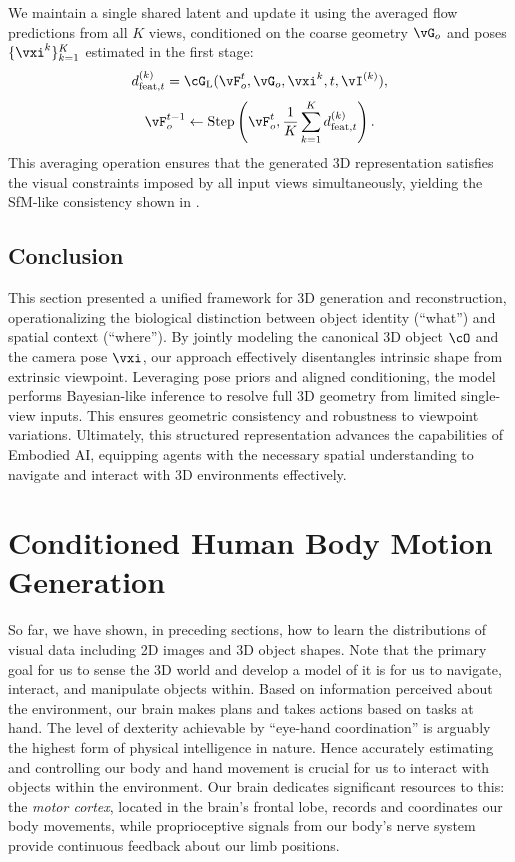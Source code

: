 \documentclass[../../book-main.tex]{subfiles}
\begin{document}
We maintain a single shared latent and update it using the averaged flow predictions from all \(K\) views, conditioned on the coarse geometry \(\vG_{o}\) and poses \(\{\pose^{k}\}_{k=1}^{K}\) estimated in the first stage:
\begin{equation}
    d_{\text{feat}, t}^{(k)} = \lflow(\vF_{o}^{t}, \vG_{o}, \pose^{k}, t, \image^{(k)}) ,
\end{equation}
\begin{equation}
    \vF_{o}^{t-1} \leftarrow \text{Step}\left(\vF_{o}^{t}, \frac{1}{K} \sum_{k=1}^{K} d_{\text{feat}, t}^{(k)}\right) .
\end{equation}
This averaging operation ensures that the generated 3D representation satisfies the visual constraints imposed by all input views simultaneously, yielding the SfM-like consistency shown in .

\subsection{Conclusion}
This section presented a unified framework for 3D generation and reconstruction, operationalizing the biological distinction between object identity (``what'') and spatial context (``where'').
By jointly modeling the canonical 3D object \(\object\) and the camera pose \(\pose\), our approach effectively disentangles intrinsic shape from extrinsic viewpoint.
Leveraging pose priors and aligned conditioning, the model performs Bayesian-like inference to resolve full 3D geometry from limited single-view inputs.
This ensures geometric consistency and robustness to viewpoint variations. Ultimately, this structured representation advances the capabilities of Embodied AI, equipping agents with the necessary spatial understanding to navigate and interact with 3D environments effectively.

\section{Conditioned Human Body Motion Generation}
\label{sec:egoallo}

So far, we have shown, in preceding sections, how to learn the
distributions of visual data including 2D images and 3D object
shapes. Note that the primary goal for us to sense the 3D world and
develop a model of it is for us to navigate, interact, and manipulate
objects within. Based on information perceived about the environment,
our brain makes plans and takes actions based on tasks at hand. The
level of dexterity achievable by ``eye-hand coordination'' is
arguably the highest form of physical intelligence in nature. Hence
accurately estimating and controlling our body and hand movement is
crucial for us to interact with objects within the environment. Our
brain dedicates significant resources to this: the \textit{motor
cortex}, located in the brain's frontal lobe, records and coordinates
our body movements, while proprioceptive signals from our body's
nerve system provide continuous feedback about our limb positions.
\end{document}
